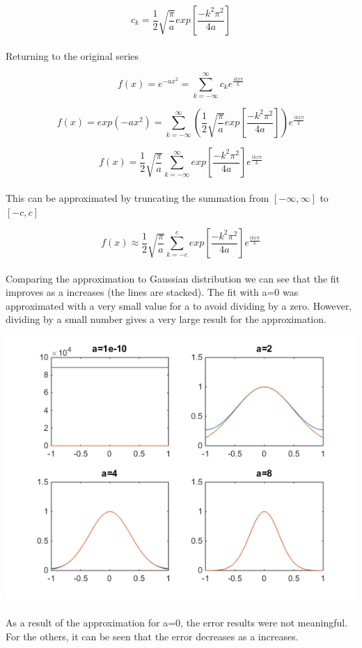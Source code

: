 \documentclass[10pt]{article}
\begin{document}
\[ c_k=\frac{1}{2}\sqrt{\frac{\pi}{a}}exp\left[ \frac{-k^2\pi^2}{4a} \right] \]
\\
Returning to the original series

\[f(x)=e^{-ax^2}=\sum_{k=-\infty}^{\infty}c_ke^{\frac{ikx\pi}{L}} \]

\[f(x)=exp(-ax^2)=\sum_{k=-\infty}^{\infty} \left(\frac{1}{2}\sqrt{\frac{\pi}{a}}exp\left[ \frac{-k^2\pi^2}{4a} \right] \right) e^{\frac{ikx\pi}{L}} \]

\[ f(x)=\frac{1}{2}\sqrt{\frac{\pi}{a}} \sum_{k=-\infty}^{\infty} exp\left[ \frac{-k^2 \pi^2}{4a} \right] e^{\frac{ikx\pi}{L}} \]
\\
This can be approximated by truncating the summation from $[-\infty,\infty]$ to $[-c,c]$

\[ f(x) \approx \frac{1}{2}\sqrt{\frac{\pi}{a}} \sum_{k=-c}^{c} exp\left[ \frac{-k^2 \pi^2}{4a} \right] e^{\frac{ikx\pi}{L}} \]
\\
Comparing the approximation to Gaussian distribution we can see that the fit improves as a increases (the lines are stacked). The fit with a=0 was approximated with a very small value for a to avoid dividing by a zero. However, dividing by a small number gives a very large result for the approximation. 

\includegraphics{CBE660_Assign8_2_Fig2.png} \\
\\
As a result of the approximation for a=0, the error results were not meaningful. For the others, it can be seen that the error decreases as a increases. 
\end{document}
